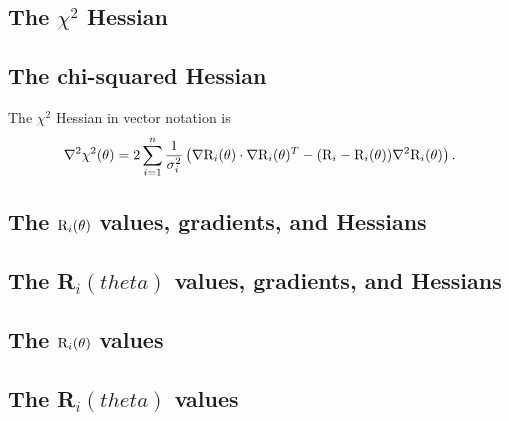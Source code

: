 \begin{latexonly}
    \subsection{The $\chi^2$ Hessian}
\end{latexonly}
\begin{htmlonly}
    \subsection{The chi-squared Hessian}
\end{htmlonly}

The $\chi^2$ Hessian in vector notation is
\begin{equation}
 \nabla^2 \chi^2(\theta) = 2 \sum_{i=1}^n \frac{1}{\sigma_i^2} \left(\nabla \mathrm{R}_i(\theta) \cdot \nabla \mathrm{R}_i(\theta)^T - (\mathrm{R}_i - \mathrm{R}_i(\theta)) \nabla^2 \mathrm{R}_i(\theta) \right).
\end{equation}




\newpage
\begin{latexonly}
    \section{The $\mathrm{R}_i(\theta)$ values, gradients, and Hessians}
\end{latexonly}
\begin{htmlonly}
    \section{The R$_i(theta)$ values, gradients, and Hessians}
\end{htmlonly}


\begin{latexonly}
    \subsection{The $\mathrm{R}_i(\theta)$ values}
\end{latexonly}
\begin{htmlonly}
    \subsection{The R$_i(theta)$ values}
\end{htmlonly}

